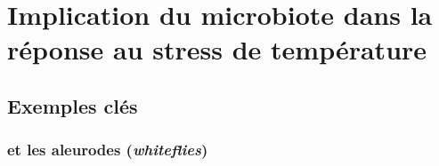 \chapter{Implication du microbiote dans la réponse au stress de température} %
\label{sec:implicationµbiote}
	
	\section{Exemples clés} %
	\label{sec:exemples}
		

		\subsection{ et les aleurodes (\textit{whiteflies})} %
		\label{sub:rickettsia_et_les_aleurodes_}
			
	
